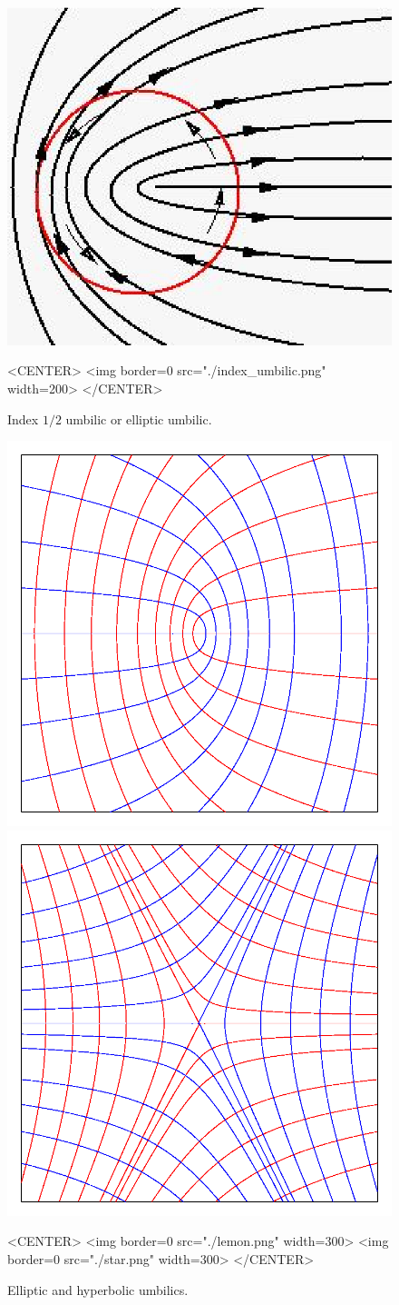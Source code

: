 \begin{figure}[!ht]
\begin{ccTexOnly}
\centerline{
\includegraphics[width=.5\linewidth]{Ridges_3/index_umbilic}}
\end{ccTexOnly}

\begin{ccHtmlOnly}
<CENTER> <img border=0 src="./index_umbilic.png" width=200>
</CENTER>
\end{ccHtmlOnly}
\caption{Index $1/2$ umbilic or elliptic umbilic.}
\label{index_umbilic}
\end{figure}


\begin{figure}[!ht]
\begin{ccTexOnly}
\centerline{
\includegraphics[width=.5\linewidth]{Ridges_3/lemon}
\includegraphics[width=.5\linewidth]{Ridges_3/star}}
\end{ccTexOnly}

\begin{ccHtmlOnly}
<CENTER> <img border=0 src="./lemon.png" width=300>
 <img border=0 src="./star.png" width=300>
</CENTER>
\end{ccHtmlOnly}
\caption{Elliptic and hyperbolic umbilics.}
\label{umbilics}
\end{figure}



